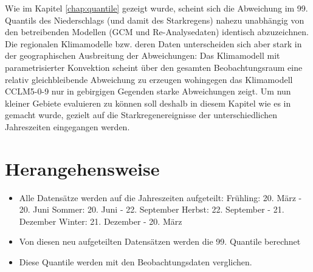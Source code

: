 Wie im Kapitel \ref{chap:quantile} gezeigt wurde, scheint sich die Abweichung im 99. Quantils des Niederschlags (und damit des Starkregens) nahezu unabhängig von den betreibenden Modellen (GCM und Re-Analysedaten) identisch abzuzeichnen. Die regionalen Klimamodelle bzw. deren Daten unterscheiden sich aber stark in der geographischen Ausbreitung der Abweichungen: Das Klimamodell mit parametrisierter Konvektion scheint über den gesamten Beobachtungsraum eine relativ gleichbleibende Abweichung zu erzeugen wohingegen das Klimamodell CCLM5-0-9 nur in gebirgigen Gegenden starke Abweichungen zeigt. Um nun kleiner Gebiete evaluieren zu können soll deshalb in diesem Kapitel wie es in \cite{biasMaraun} gemacht wurde, gezielt auf die Starkregenereignisse der unterschiedlichen Jahreszeiten eingegangen werden.
\section{Herangehensweise}\label{sec:Herangehensweise}
\begin{itemize}
\item Alle Datensätze werden auf die Jahreszeiten aufgeteilt:
	\subitem Frühling: 20. März - 20. Juni
	\subitem Sommer: 20. Juni - 22. September
	\subitem Herbst: 22. September - 21. Dezember
	\subitem Winter: 21. Dezember - 20. März
\item Von diesen neu aufgeteilten Datensätzen werden die 99. Quantile berechnet
\item Diese Quantile werden mit den Beobachtungsdaten verglichen.
\end{itemize}

